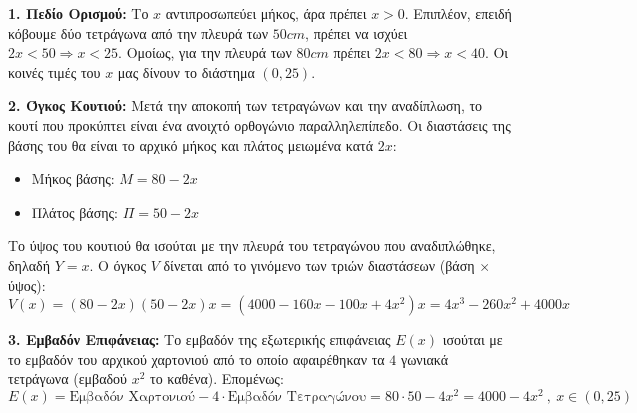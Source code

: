 
\lysh
\textbf{1. Πεδίο Ορισμού:}
Το $x$ αντιπροσωπεύει μήκος, άρα πρέπει $x > 0$. Επιπλέον, επειδή κόβουμε δύο τετράγωνα από την πλευρά των $50\si{ cm}$, πρέπει να ισχύει $2x < 50 \Rightarrow x < 25$. Ομοίως, για την πλευρά των $80\si{ cm}$ πρέπει $2x < 80 \Rightarrow x < 40$. Οι κοινές τιμές του $x$ μας δίνουν το διάστημα $(0, 25)$.

\textbf{2. Όγκος Κουτιού:}
Μετά την αποκοπή των τετραγώνων και την αναδίπλωση, το κουτί που προκύπτει είναι ένα ανοιχτό ορθογώνιο παραλληλεπίπεδο. Οι διαστάσεις της βάσης του θα είναι το αρχικό μήκος και πλάτος μειωμένα κατά $2x$:
\begin{itemize}
\item Μήκος βάσης: $M = 80 - 2x$
\item Πλάτος βάσης: $\Pi = 50 - 2x$
\end{itemize}
Το ύψος του κουτιού θα ισούται με την πλευρά του τετραγώνου που αναδιπλώθηκε, δηλαδή $Y = x$.
Ο όγκος $V$ δίνεται από το γινόμενο των τριών διαστάσεων (βάση $\times$ ύψος):
\[ V(x) = (80 - 2x)(50 - 2x)x = (4000 - 160x - 100x + 4x^2)x = 4x^3 - 260x^2 + 4000x \]

\textbf{3. Εμβαδόν Επιφάνειας:}
Το εμβαδόν της εξωτερικής επιφάνειας $E(x)$ ισούται με το εμβαδόν του αρχικού χαρτονιού από το οποίο αφαιρέθηκαν τα $4$ γωνιακά τετράγωνα (εμβαδού $x^2$ το καθένα). Επομένως:
\[ E(x) = \text{Εμβαδόν Χαρτονιού} - 4 \cdot \text{Εμβαδόν Τετραγώνου} = 80 \cdot 50 - 4x^2 = 4000 - 4x^2\ ,\ x\in(0,25) \]

